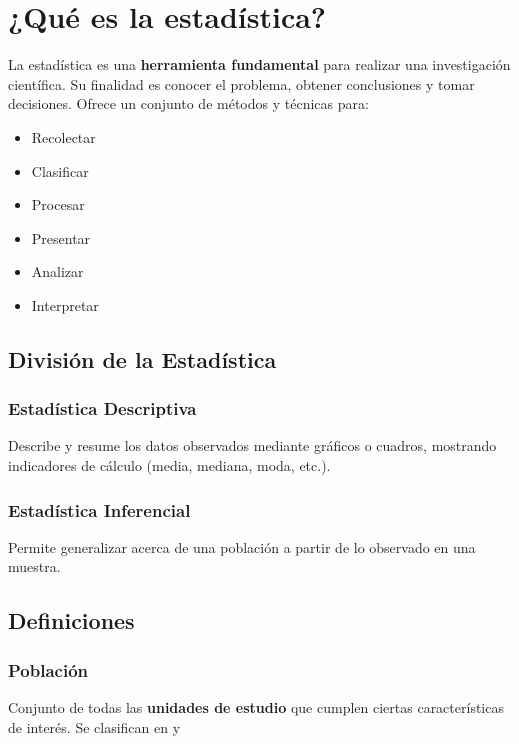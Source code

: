 \documentclass{article}
\begin{document}
\tableofcontents
\newpage


\section{¿Qué es la estadística?}
    La estadística es una \textbf{herramienta fundamental} para realizar una investigación científica. Su finalidad es conocer el problema, obtener conclusiones y tomar decisiones. Ofrece un conjunto de métodos y técnicas para:

    \begin{multicols}{2}
    \begin{itemize}
    \item Recolectar
    \item Clasificar
    \item Procesar
    \item Presentar
    \item Analizar
    \item Interpretar
    \end{itemize}
    \end{multicols}

    \subsection{División de la Estadística}

        \subsubsection{Estadística Descriptiva}
            Describe y resume los datos observados mediante gráficos o cuadros, mostrando indicadores de cálculo (media, mediana, moda, etc.).

        \subsubsection{Estadística Inferencial}
            Permite generalizar acerca de una población a partir de lo observado en una muestra.

    \subsection{Definiciones}

        \subsubsection{Población}
            Conjunto de todas las \textbf{unidades de estudio} que cumplen ciertas características de interés. Se clasifican en  y 
            
\end{document}
